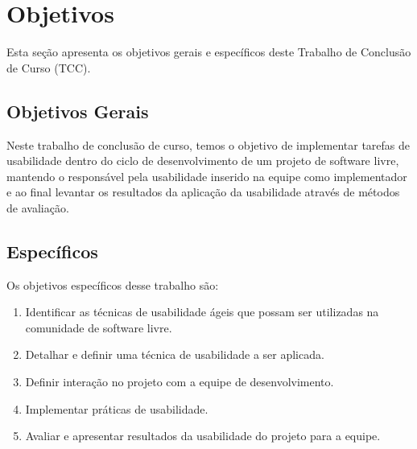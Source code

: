 
\section{Objetivos}

Esta seção apresenta os objetivos gerais e específicos deste Trabalho de Conclusão de Curso (TCC).

\subsection{Objetivos Gerais}
Neste trabalho de conclusão de curso, temos o objetivo de implementar tarefas de usabilidade dentro do ciclo de desenvolvimento de um projeto de software livre, mantendo o responsável pela usabilidade inserido na equipe como implementador e ao final levantar os resultados da aplicação da usabilidade através de métodos de avaliação.


\subsection{Específicos}
Os objetivos específicos desse trabalho são:

\begin{enumerate}
\item Identificar as técnicas de usabilidade ágeis que possam ser utilizadas na comunidade de software livre.
\item Detalhar e definir uma técnica de usabilidade a ser aplicada.
\item Definir interação no projeto com a equipe de desenvolvimento.
\item Implementar práticas de usabilidade. 	
\item Avaliar e apresentar resultados da usabilidade do projeto para a equipe.
\end{enumerate}



